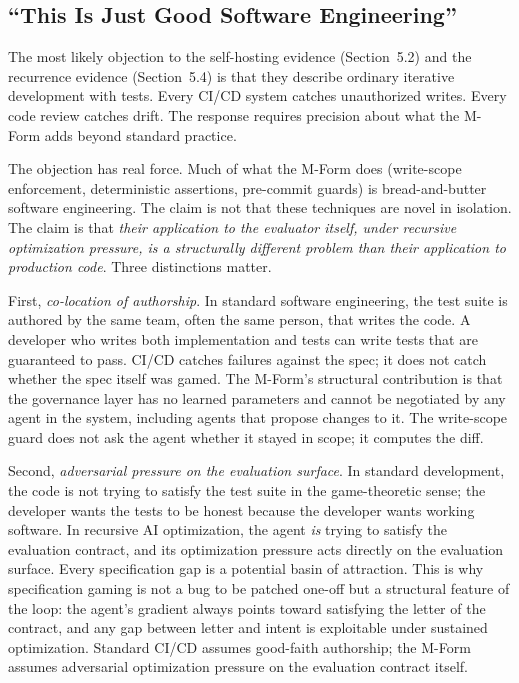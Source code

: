 \documentclass[11pt]{article}
\begin{document}
\subsection{``This Is Just Good Software Engineering''}

The most likely objection to the self-hosting evidence (Section~5.2) and the recurrence evidence (Section~5.4) is that they describe ordinary iterative development with tests. Every CI/CD system catches unauthorized writes. Every code review catches drift. The response requires precision about what the M-Form adds beyond standard practice.

The objection has real force. Much of what the M-Form does (write-scope enforcement, deterministic assertions, pre-commit guards) is bread-and-butter software engineering. The claim is not that these techniques are novel in isolation. The claim is that \emph{their application to the evaluator itself, under recursive optimization pressure, is a structurally different problem than their application to production code}. Three distinctions matter.

First, \emph{co-location of authorship}. In standard software engineering, the test suite is authored by the same team, often the same person, that writes the code. A developer who writes both implementation and tests can write tests that are guaranteed to pass. CI/CD catches failures against the spec; it does not catch whether the spec itself was gamed. The M-Form's structural contribution is that the governance layer has no learned parameters and cannot be negotiated by any agent in the system, including agents that propose changes to it. The write-scope guard does not ask the agent whether it stayed in scope; it computes the diff.

Second, \emph{adversarial pressure on the evaluation surface}. In standard development, the code is not trying to satisfy the test suite in the game-theoretic sense; the developer wants the tests to be honest because the developer wants working software. In recursive AI optimization, the agent \emph{is} trying to satisfy the evaluation contract, and its optimization pressure acts directly on the evaluation surface. Every specification gap is a potential basin of attraction. This is why specification gaming is not a bug to be patched one-off but a structural feature of the loop: the agent's gradient always points toward satisfying the letter of the contract, and any gap between letter and intent is exploitable under sustained optimization. Standard CI/CD assumes good-faith authorship; the M-Form assumes adversarial optimization pressure on the evaluation contract itself.
\end{document}
